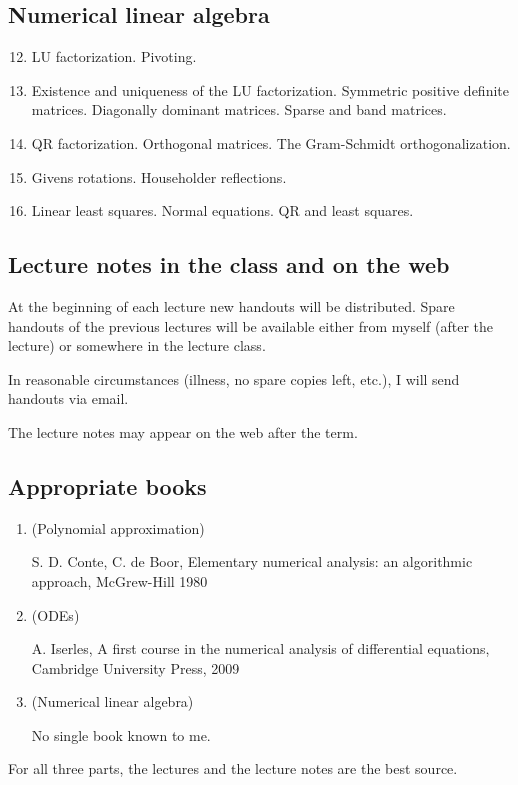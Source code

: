 \subsection{Numerical linear algebra}
\begin{enumerate}
    \setcounter{enumi}{11}
  \item LU factorization. Pivoting.

  \item Existence and uniqueness of the LU factorization. Symmetric positive definite matrices. Diagonally dominant matrices. Sparse and band matrices.

  \item QR factorization. Orthogonal matrices. The Gram-Schmidt orthogonalization.

  \item Givens rotations. Householder reflections.

  \item Linear least squares. Normal equations. QR and least squares.

\end{enumerate}

\subsection{Lecture notes in the class and on the web}
At the beginning of each lecture new handouts will be distributed. Spare handouts of the previous lectures will be available either from myself (after the lecture) or somewhere in the lecture class.

In reasonable circumstances (illness, no spare copies left, etc.), I will send handouts via email.

The lecture notes may appear on the web after the term.

\subsection{Appropriate books}

\begin{enumerate}
    \item (Polynomial approximation)
    
    S. D. Conte, C. de Boor, Elementary numerical analysis: an algorithmic approach, McGrew-Hill 1980
  \item (ODEs)
  
  A. Iserles, A first course in the numerical analysis of differential equations, Cambridge University Press, 2009
  \item (Numerical linear algebra)
  
  No single book known to me.
\end{enumerate}
For all three parts, the lectures and the lecture notes are the best source.

